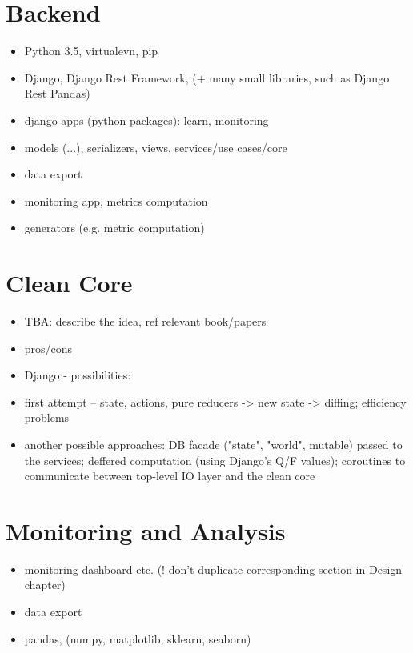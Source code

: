 \section{Backend}

\begin{itemize}
\item Python 3.5, virtualevn, pip
\item Django, Django Rest Framework, (+ many small libraries, such as Django Rest Pandas)
\item django apps (python packages): learn, monitoring
\item models (...), serializers, views, services/use cases/core
\item data export
\item monitoring app, metrics computation
\item generators (e.g. metric computation)
\end{itemize}

\section{Clean Core}

\begin{itemize}
\item TBA: describe the idea, ref relevant book/papers
\item pros/cons
\item Django - possibilities:
\item first attempt -- state, actions, pure reducers -> new state -> diffing; efficiency problems
\item another possible approaches: DB facade ("state", "world", mutable) passed to the services;
  deffered computation (using Django's Q/F values); coroutines to communicate between top-level IO layer and the clean core
\end{itemize}


\section{Monitoring and Analysis}

\begin{itemize}
\item monitoring dashboard etc. (! don't duplicate corresponding section in Design chapter)
\item data export
\item pandas, (numpy, matplotlib, sklearn, seaborn)
\end{itemize}


